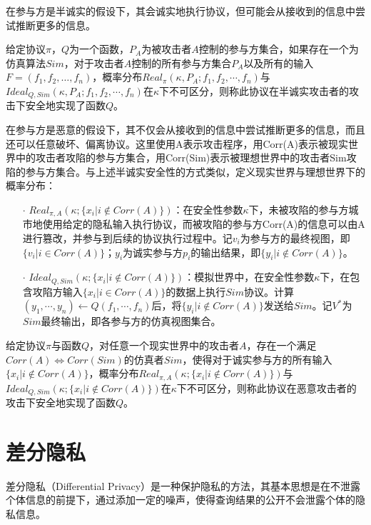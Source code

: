 在参与方是半诚实的假设下，其会诚实地执行协议，但可能会从接收到的信息中尝试推断更多的信息。

\begin{definition}{}
	给定协议$\pi$，$Q$为一个函数，$P_A$为被攻击者$A$控制的参与方集合，如果存在一个为仿真算法$Sim$，对于攻击者$A$控制的所有参与方集合$P_A$以及所有的输入$F=(f_1, f_2, \dots, f_n)$，概率分布$Real_\pi(\kappa,P_A;f_1,f_2,\cdots,f_n)$与$Ideal_{Q,Sim}(\kappa,P_A;f_1,f_2,\cdots,f_n)$在$\kappa$下不可区分，则称此协议在半诚实攻击者的攻击下安全地实现了函数$Q$。
\end{definition}

在参与方是恶意的假设下，其不仅会从接收到的信息中尝试推断更多的信息，而且还可以任意破坏、偏离协议。这里使用A表示攻击程序，用Corr(A)表示被现实世界中的攻击者攻陷的参与方集合，用Corr(Sim)表示被理想世界中的攻击者Sim攻陷的参与方集合。与上述半诚实安全性的方式类似，定义现实世界与理想世界下的概率分布：
\begin{itemize}
	\item [$\cdot$]
	$Real_{\pi,A}(\kappa;\{x_i|i\notin Corr(A)\})$：在安全性参数$\kappa$下，未被攻陷的参与方城市地使用给定的隐私输入执行协议，而被攻陷的参与方Corr(A)的信息可以由A进行篡改，并参与到后续的协议执行过程中。记$v_i$为参与方的最终视图，即$\{v_i|i\in Corr(A)\}$；$y_i$为诚实参与方$p_i$的输出结果，即$\{y_i|i\notin Corr(A)\}$。
	\item [$\cdot$]
	$Ideal_{Q,Sim}(\kappa;\{x_i|i\notin Corr(A)\})$：模拟世界中，在安全性参数$\kappa$下，在包含攻陷方输入$\{x_i|i\in Corr(A)\}$的数据上执行$Sim$协议。计算$(y_1,\cdots,y_n)\leftarrow Q(f_1,\cdots,f_n)$后，将$\{y_i|i\notin Corr(A)\}$发送给$Sim$。记$V^*$为$Sim$最终输出，即各参与方的仿真视图集合。
\end{itemize}

\begin{definition}{}
	给定协议$\pi$与函数$Q$，对任意一个现实世界中的攻击者$A$，存在一个满足$Corr(A)\Longleftrightarrow Corr(Sim)$的仿真者$Sim$，使得对于诚实参与方的所有输入$\{x_i|i\notin Corr(A)\}$，概率分布$Real_{\pi,A}(\kappa;\{x_i|i\notin Corr(A)\})$与$Ideal_{Q,Sim}(\kappa;\{x_i|i\notin Corr(A)\})$在$\kappa$下不可区分，则称此协议在恶意攻击者的攻击下安全地实现了函数$Q$。
\end{definition}

\section{差分隐私}

差分隐私（Differential Privacy）\cite{DP}是一种保护隐私的方法，其基本思想是在不泄露个体信息的前提下，通过添加一定的噪声，使得查询结果的公开不会泄露个体的隐私信息。

